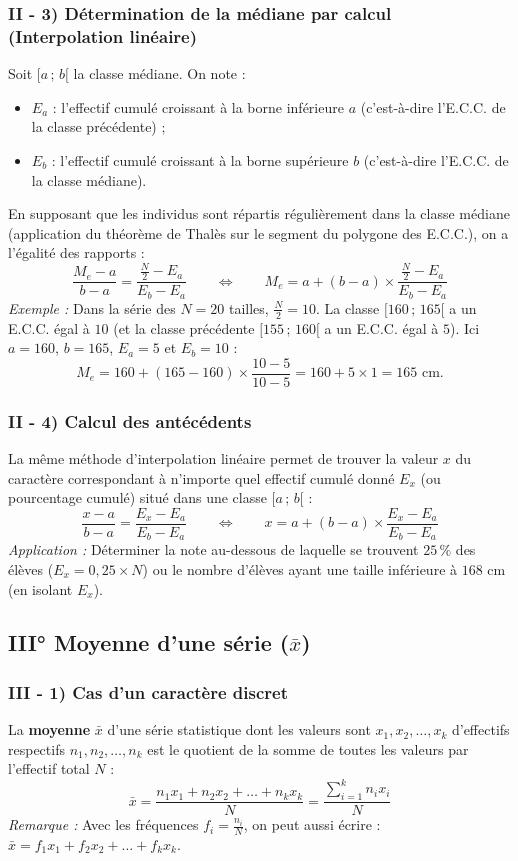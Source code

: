 \documentclass[11pt, a4paper]{article}
\begin{document}
\subsubsection*{II - 3) Détermination de la médiane par calcul (Interpolation linéaire)}
Soit $[a\,;\,b[$ la classe médiane. On note :
\begin{itemize}
    \item $E_a$ : l'effectif cumulé croissant à la borne inférieure $a$ (c'est-à-dire l'E.C.C. de la classe précédente) ;
    \item $E_b$ : l'effectif cumulé croissant à la borne supérieure $b$ (c'est-à-dire l'E.C.C. de la classe médiane).
\end{itemize}
En supposant que les individus sont répartis régulièrement dans la classe médiane (application du théorème de Thalès sur le segment du polygone des E.C.C.), on a l'égalité des rapports :
\[
    \frac{M_e - a}{b - a} = \frac{\frac{N}{2} - E_a}{E_b - E_a} \qquad \Longleftrightarrow \qquad M_e = a + (b - a) \times \frac{\frac{N}{2} - E_a}{E_b - E_a}
\]
\textit{Exemple :} Dans la série des $N = 20$ tailles, $\frac{N}{2} = 10$. La classe $[160\,;\,165[$ a un E.C.C. égal à $10$ (et la classe précédente $[155\,;\,160[$ a un E.C.C. égal à $5$). Ici $a = 160$, $b = 165$, $E_a = 5$ et $E_b = 10$ :
\[
    M_e = 160 + (165 - 160) \times \frac{10 - 5}{10 - 5} = 160 + 5 \times 1 = 165\text{ cm}.
\]

\subsubsection*{II - 4) Calcul des antécédents}
La même méthode d'interpolation linéaire permet de trouver la valeur $x$ du caractère correspondant à n'importe quel effectif cumulé donné $E_x$ (ou pourcentage cumulé) situé dans une classe $[a\,;\,b[$ :
\[
    \frac{x - a}{b - a} = \frac{E_x - E_a}{E_b - E_a} \qquad \Longleftrightarrow \qquad x = a + (b - a) \times \frac{E_x - E_a}{E_b - E_a}
\]
\textit{Application :} Déterminer la note au-dessous de laquelle se trouvent $25\,\%$ des élèves ($E_x = 0,25 \times N$) ou le nombre d'élèves ayant une taille inférieure à $168\text{ cm}$ (en isolant $E_x$).

\subsection*{\textcolor{primary}{III° Moyenne d'une série ($\bar{x}$)}}

\subsubsection*{III - 1) Cas d'un caractère discret}
La \textbf{moyenne} $\bar{x}$ d'une série statistique dont les valeurs sont $x_1, x_2, \dots, x_k$ d'effectifs respectifs $n_1, n_2, \dots, n_k$ est le quotient de la somme de toutes les valeurs par l'effectif total $N$ :
\[
    \bar{x} = \frac{n_1 x_1 + n_2 x_2 + \dots + n_k x_k}{N} = \frac{\sum_{i=1}^{k} n_i x_i}{N}
\]
\textit{Remarque :} Avec les fréquences $f_i = \frac{n_i}{N}$, on peut aussi écrire : $\bar{x} = f_1 x_1 + f_2 x_2 + \dots + f_k x_k$.
\end{document}
